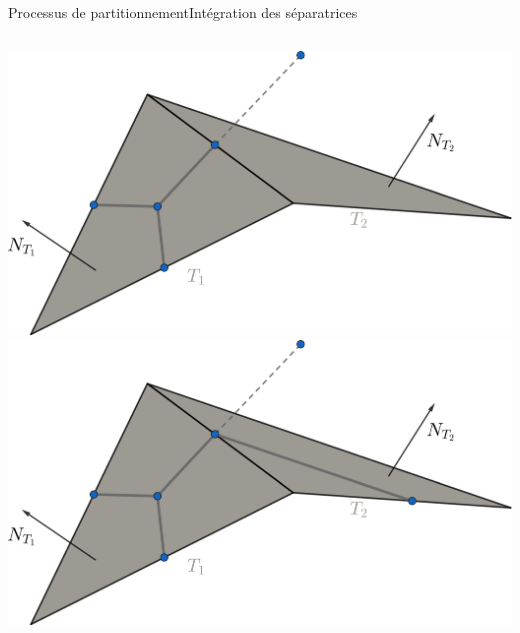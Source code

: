 \documentclass[compress,10pt,aspectratio=169]{beamer}
\begin{document}
\begin{frame}{Processus de partitionnement}{Intégration des séparatrices}
\begin{columns}
\begin{column}{0.5\textwidth}
\centering
\vspace{-0.1cm}
\includegraphics[scale=0.15]{images/draw_sepa_space_1.pdf}\\\vspace{0.2cm}
\includegraphics[scale=0.15]{images/draw_sepa_space_2.pdf}\\\vspace{0.3cm}
\end{column}
\end{columns}
\end{frame}
\end{document}
